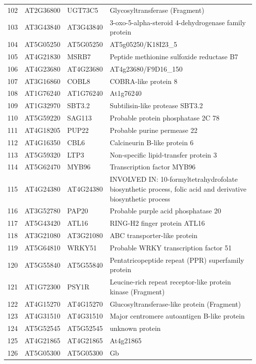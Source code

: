 \documentclass[11pt]{article}
\begin{document}
\begin{center}
\begin{tabular}{rlll}
102 & AT2G36800 & UGT73C5 & Glycosyltransferase (Fragment)\\
103 & AT3G43840 & AT3G43840 & 3-oxo-5-alpha-steroid 4-dehydrogenase family protein\\
104 & AT5G05250 & AT5G05250 & AT5g05250/K18I23\_5\\
105 & AT4G21830 & MSRB7 & Peptide methionine sulfoxide reductase B7\\
106 & AT4G23680 & AT4G23680 & AT4g23680/F9D16\_150\\
107 & AT3G16860 & COBL8 & COBRA-like protein 8\\
108 & AT1G76240 & AT1G76240 & At1g76240\\
109 & AT1G32970 & SBT3.2 & Subtilisin-like protease SBT3.2\\
110 & AT5G59220 & SAG113 & Probable protein phosphatase 2C 78\\
111 & AT4G18205 & PUP22 & Probable purine permease 22\\
112 & AT4G16350 & CBL6 & Calcineurin B-like protein 6\\
113 & AT5G59320 & LTP3 & Non-specific lipid-transfer protein 3\\
114 & AT5G62470 & MYB96 & Transcription factor MYB96\\
115 & AT4G24380 & AT4G24380 & INVOLVED IN: 10-formyltetrahydrofolate biosynthetic process, folic acid and derivative biosynthetic process\\
116 & AT3G52780 & PAP20 & Probable purple acid phosphatase 20\\
117 & AT5G43420 & ATL16 & RING-H2 finger protein ATL16\\
118 & AT3G21080 & AT3G21080 & ABC transporter-like protein\\
119 & AT5G64810 & WRKY51 & Probable WRKY transcription factor 51\\
120 & AT5G55840 & AT5G55840 & Pentatricopeptide repeat (PPR) superfamily protein\\
121 & AT1G72300 & PSY1R & Leucine-rich repeat receptor-like protein kinase (Fragment)\\
122 & AT4G15270 & AT4G15270 & Glucosyltransferase-like protein (Fragment)\\
123 & AT4G31510 & AT4G31510 & Major centromere autoantigen B-like protein\\
124 & AT5G52545 & AT5G52545 & unknown protein\\
125 & AT4G21865 & AT4G21865 & At4g21865\\
126 & AT5G05300 & AT5G05300 & Gb\\

\end{tabular}
\end{center}
\end{document}
